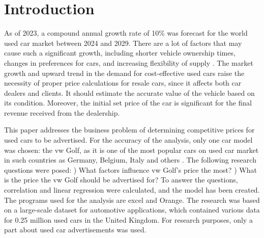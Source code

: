 \chapter{Introduction}
As of 2023, a compound annual growth rate of 10\% was forecast for the world used car market between 2024 and 2029.
There are a lot of factors that may cause such a significant growth, including shorter vehicle ownership times, changes in preferences for cars, and increasing flexibility of supply \autocite{UsedCarMarket}.
The market growth and upward trend in the demand for cost-effective used cars \autocite{EuropeUsedCar} raise the necessity of proper price calculations for resale cars, since it affects both car dealers and clients.
It should estimate the accurate value of the vehicle based on its condition. Moreover, the initial set price of the car is significant for the final revenue received from the dealership.

This paper addresses the business problem of determining competitive prices for used cars to be advertised.
For the accuracy of the analysis, only one car model was chosen: the \ac{vw} Golf, as it is one of the most popular cars on used car market in such countries as Germany, Belgium, Italy and others \autocite{misselhornDevelopmentUsedCar2024}.
The following research questions were posed: 
) What factors influence \ac{vw} Golf's price the most? ) What is the price the \ac{vw} Golf should be advertised for?\newline
To answer the questions, correlation and linear regression were calculated, and the model has been created. The programs used for the analysis are \ac{excel} and Orange.
The research was based on a large-scale dataset for automotive applications, which contained various data for 0.25 million used cars in the United Kingdom. For research purposes, only a part about used car advertisements was used.

